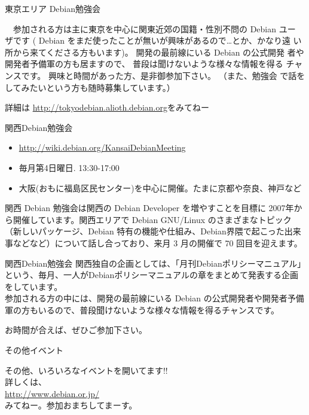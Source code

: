 \begin{frame}{東京エリア Debian勉強会}

　参加される方は主に東京を中心に関東近郊の国籍・性別不問の Debian ユー
ザです ( Debian をまだ使ったことが無いが興味があるので…とか、かなり遠
い所から来てくださる方もいます)。 開発の最前線にいる Debian の公式開発
者や開発者予備軍の方も居ますので、 普段は聞けないような様々な情報を得る
チャンスです。 興味と時間があった方、是非御参加下さい。 （また、勉強会
で話をしてみたいという方も随時募集しています。）

詳細は \url{http://tokyodebian.alioth.debian.org}をみてねー

\end{frame}

\begin{frame}{関西Debian勉強会}

\begin{itemize}
\item \url{http://wiki.debian.org/KansaiDebianMeeting}
\item  毎月第4日曜日. 13:30-17:00
\item 大阪(おもに福島区民センター)を中心に開催。たまに京都や奈良、神戸など
\end{itemize}

 関西 Debian 勉強会は関西の Debian Developer を増やすことを目標に 2007年から開催しています。関西エリアで Debian GNU/Linux のさまざまなトピック（新しいパッケージ、Debian 特有の機能や仕組み、Debian界隈で起こった出来事などなど）について話し合っており、来月 3 月の開催で 70 回目を迎えます。
\end{frame}

\begin{frame}{関西Debian勉強会}
 関西独自の企画としては、「月刊Debianポリシーマニュアル」という、毎月、一人がDebianポリシーマニュアルの章をまとめて発表する企画をしています。\\

 参加される方の中には、開発の最前線にいる Debian の公式開発者や開発者予備軍の方もいるので、普段聞けないような様々な情報を得るチャンスです。\\
\begin{center}
\Large
お時間が合えば、ぜひご参加下さい。
\end{center}
\end{frame}

\begin{frame}{その他イベント}

\begin{center}
\Large
 その他、いろいろなイベントを開いてます!!\\
詳しくは、\\
\url{http://www.debian.or.jp/}\\
みてねー。参加おまちしてまーす。
\end{center}

\end{frame}

